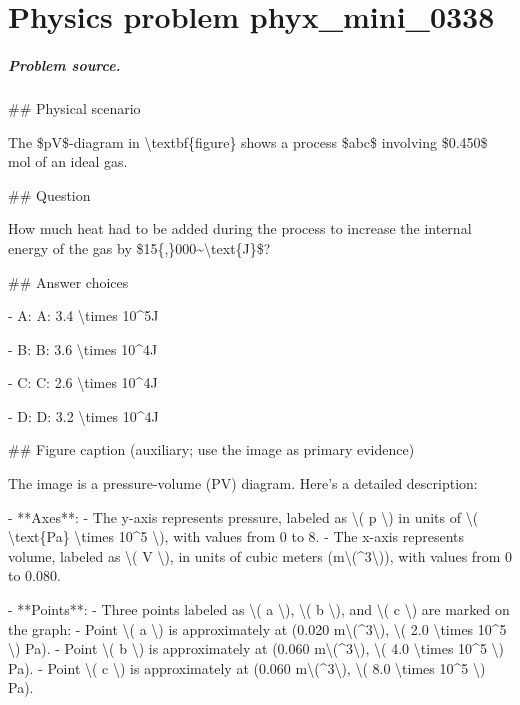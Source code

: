 
\chapter{Physics problem phyx\_mini\_0338}
\label{ch:PhyXMiniProblems_problem_phyx_mini_0338}

\paragraph{Problem source.}
\#\# Physical scenario

The \$pV\$-diagram in \textbackslash{}textbf\{figure\} shows a process \$abc\$ involving \$0.450\$ mol of an ideal gas.

\#\# Question

How much heat had to be added during the process to increase the internal energy of the gas by \$15\{,\}000\textasciitilde{}\textbackslash{}text\{J\}\$?

\#\# Answer choices

- A: A: 3.4 \textbackslash{}times 10\textasciicircum{}5J

- B: B: 3.6 \textbackslash{}times 10\textasciicircum{}4J

- C: C: 2.6 \textbackslash{}times 10\textasciicircum{}4J

- D: D: 3.2 \textbackslash{}times 10\textasciicircum{}4J

\#\# Figure caption (auxiliary; use the image as primary evidence)

The image is a pressure-volume (PV) diagram. Here's a detailed description:

- **Axes**: 
  - The y-axis represents pressure, labeled as \textbackslash{}( p \textbackslash{}) in units of \textbackslash{}( \textbackslash{}text\{Pa\} \textbackslash{}times 10\textasciicircum{}5 \textbackslash{}), with values from 0 to 8.
  - The x-axis represents volume, labeled as \textbackslash{}( V \textbackslash{}), in units of cubic meters (m\textbackslash{}(\textasciicircum{}3\textbackslash{})), with values from 0 to 0.080.

- **Points**:
  - Three points labeled as \textbackslash{}( a \textbackslash{}), \textbackslash{}( b \textbackslash{}), and \textbackslash{}( c \textbackslash{}) are marked on the graph:
    - Point \textbackslash{}( a \textbackslash{}) is approximately at (0.020 m\textbackslash{}(\textasciicircum{}3\textbackslash{}), \textbackslash{}( 2.0 \textbackslash{}times 10\textasciicircum{}5 \textbackslash{}) Pa).
    - Point \textbackslash{}( b \textbackslash{}) is approximately at (0.060 m\textbackslash{}(\textasciicircum{}3\textbackslash{}), \textbackslash{}( 4.0 \textbackslash{}times 10\textasciicircum{}5 \textbackslash{}) Pa).
    - Point \textbackslash{}( c \textbackslash{}) is approximately at (0.060 m\textbackslash{}(\textasciicircum{}3\textbackslash{}), \textbackslash{}( 8.0 \textbackslash{}times 10\textasciicircum{}5 \textbackslash{}) Pa).

